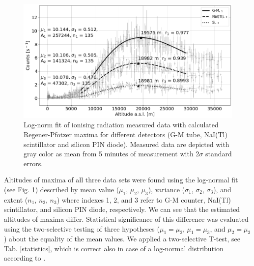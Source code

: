 \documentclass{Rpd}
\begin{document}
\begin{figure}
	\centerline{\includegraphics[width=\columnwidth]{img/FIK-6_R-P_maximum.png}}
	\caption{Log-norm fit of ionising radiation measured data with calculated Regener-Pfotzer maxima for different detectors (G-M tube, NaI(Tl) scintillator and silicon PIN diode). Measured data are depicted with gray color as mean from 5 minutes of measurement with 2$\sigma$ standard errors. \label{R-P_maximum}}
\end{figure}

Altitudes of maxima of all three data sets were found using the log-normal fit (see Fig. \ref{R-P_maximum}) described by mean value ($\mu_1$, $\mu_2$, $\mu_3$), variance ($\sigma_1$, $\sigma_2$, $\sigma_3$), and extent ($n_1$, $n_2$, $n_3$) where indexes 1, 2, and 3 refer to G-M counter, NaI(Tl) scintillator, and silicon PIN diode, respectively. We can see that the estimated altitudes of maxima differ. Statistical significance of this difference was evaluated using the two-selective testing of three hypotheses ($\mu_1 = \mu_2$, $\mu_1 = \mu_3$, and $\mu_2 = \mu_3$) about the equality of the mean values. We applied a two-selective T-test, see Tab. \ref{statistics}, which is correct also in case of a log-normal distribution according to \cite{confidence_intervals}.
\end{document}

